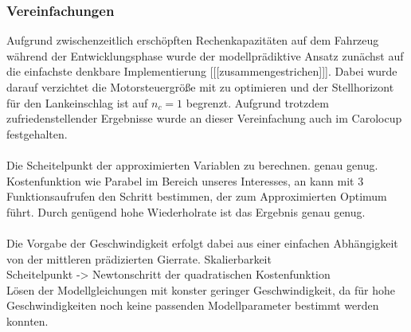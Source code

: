\subsubsection{Vereinfachungen}
Aufgrund zwischenzeitlich erschöpften Rechenkapazitäten auf dem Fahrzeug während der Entwicklungsphase wurde der modellprädiktive Ansatz zunächst auf die einfachste denkbare Implementierung [[[zusammengestrichen]]]. Dabei wurde darauf verzichtet die Motorsteuergröße mit zu optimieren und der Stellhorizont für den Lankeinschlag ist auf $n_c=1$ begrenzt. Aufgrund trotzdem zufriedenstellender Ergebnisse wurde an dieser Vereinfachung auch im Carolocup festgehalten.\\ \\
Die Scheitelpunkt der approximierten Variablen zu berechnen. genau genug.\\
Kostenfunktion wie Parabel im Bereich unseres Interesses, an kann mit 3 Funktionsaufrufen den Schritt bestimmen, der zum Approximierten Optimum führt. Durch genügend hohe Wiederholrate ist das Ergebnis genau genug.\\ \\
Die Vorgabe der Geschwindigkeit erfolgt dabei aus einer einfachen Abhängigkeit von der mittleren prädizierten Gierrate. 
Skalierbarkeit\\
Scheitelpunkt -> Newtonschritt der quadratischen Kostenfunktion\\

Lösen der Modellgleichungen mit konster geringer Geschwindigkeit, da für hohe Geschwindigkeiten noch keine passenden Modellparameter bestimmt werden konnten.
